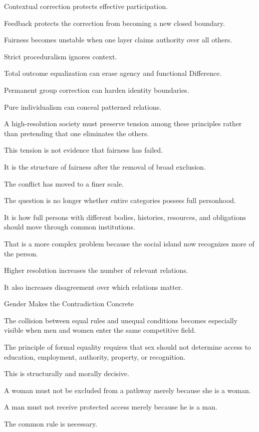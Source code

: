 Contextual correction protects effective participation.

Feedback protects the correction from becoming a new closed boundary.

Fairness becomes unstable when one layer claims authority over all others.

Strict proceduralism ignores context.

Total outcome equalization can erase agency and functional Difference.

Permanent group correction can harden identity boundaries.

Pure individualism can conceal patterned relations.

A high-resolution society must preserve tension among these principles rather than pretending that one eliminates the others.

This tension is not evidence that fairness has failed.

It is the structure of fairness after the removal of broad exclusion.

The conflict has moved to a finer scale.

The question is no longer whether entire categories possess full personhood.

It is how full persons with different bodies, histories, resources, and obligations should move through common institutions.

That is a more complex problem because the social island now recognizes more of the person.

Higher resolution increases the number of relevant relations.

It also increases disagreement over which relations matter.

Gender Makes the Contradiction Concrete

The collision between equal rules and unequal conditions becomes especially visible when men and women enter the same competitive field.

The principle of formal equality requires that sex should not determine access to education, employment, authority, property, or recognition.

This is structurally and morally decisive.

A woman must not be excluded from a pathway merely because she is a woman.

A man must not receive protected access merely because he is a man.

The common rule is necessary.

